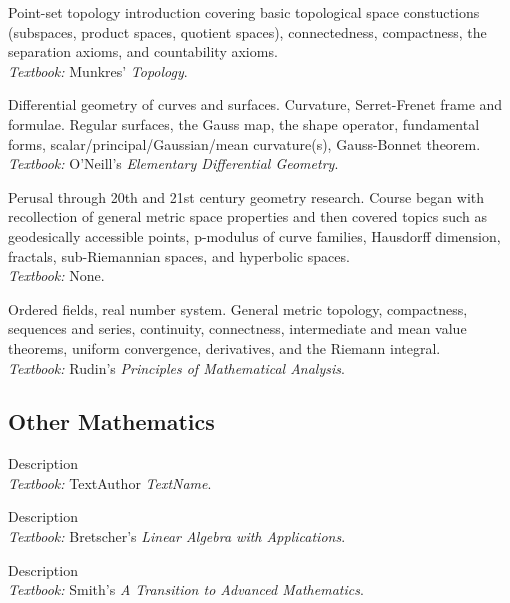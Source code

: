 \documentclass[11pt,letterpaper,sans]{moderncv}
\begin{document}
%
  {Point-set topology introduction covering basic topological space constuctions (subspaces, product spaces, quotient spaces), connectedness, compactness, the separation axioms, and countability axioms. \\ \emph{Textbook: }Munkres' \emph{Topology}.}

%
  {Differential geometry of curves and surfaces. Curvature, Serret-Frenet frame and formulae. Regular surfaces, the Gauss map, the shape operator, fundamental forms, scalar/principal/Gaussian/mean curvature(s), Gauss-Bonnet theorem. \\ \emph{Textbook: }O'Neill's \emph{Elementary Differential Geometry}.}

%
  {Perusal through 20th and 21st century geometry research. Course began with recollection of general metric space properties and then covered topics such as geodesically accessible points, p-modulus of curve families, Hausdorff dimension, fractals, sub-Riemannian spaces, and hyperbolic spaces.  \\ \emph{Textbook: }None.}

%
  {Ordered fields, real number system. General metric topology, compactness, sequences and series, continuity, connectness, intermediate and mean value theorems, uniform convergence, derivatives, and the Riemann integral. \\ \emph{Textbook: }Rudin's \emph{Principles of Mathematical Analysis}.}



\subsection{Other Mathematics}

%
  {Description \\ \emph{Textbook: }TextAuthor \emph{TextName}.}

%
  {Description \\ \emph{Textbook: }Bretscher's \emph{Linear Algebra with Applications}.}

%
  {Description \\ \emph{Textbook: }Smith's \emph{A Transition to Advanced Mathematics}.}
\end{document}
